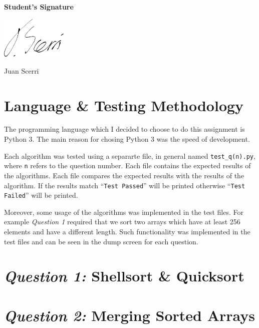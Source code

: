 \documentclass[12pt]{article}
\begin{document}
\vfill

\textbf{Student's Signature} \medskip

\underline{\includegraphics[height=2cm]{sig}} \medskip

Juan Scerri

\section{Language \& Testing Methodology}

The programming language which I decided to choose to do this
assignment is Python 3. The main reason for chosing Python 3 was
the speed of development.

Each algorithm was tested using a separarte file, in general
named \texttt{test\_q(n).py}, where \texttt{n} refers to the
question number. Each file contains the expected results of the
algorithms. Each file compares the expected results with the
results of the algorithm. If the results match ``\texttt{Test
Passed}'' will be printed otherwise ``\texttt{Test Failed}''
will be printed. 

Moreover, some usage of the algorithms was implemented in the
test files. For example \textit{Question 1} required that we
sort two arrays which have at least 256 elements and have a
different length. Such functionality was implemented in the test
files and can be seen in the dump screen for each question.

\section{\textit{Question 1:} Shellsort \& Quicksort}







\section{\textit{Question 2:} Merging Sorted Arrays}
\end{document}
